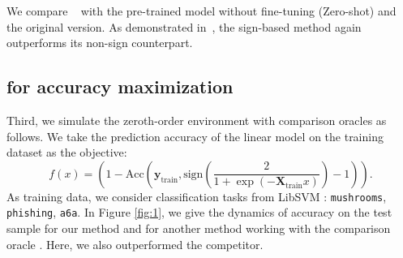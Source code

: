 We compare ~ with the pre-trained model without fine-tuning (Zero-shot) and the original  version. As demonstrated in~, the sign-based method again outperforms its non-sign counterpart.
\vspace{-5pt}
\subsection{ for accuracy maximization}
Third, we simulate the zeroth-order environment with comparison oracles as follows. We take the prediction accuracy of the linear model on the training dataset as the objective:
\vspace{-2mm}
\begin{equation*}
\textstyle
    f(x) = \left(\!1 - \text{Acc}\!\left(\mathbf{y}_{\text{train}}, \text{sign}\!\left(\!\frac{2}{1 + \exp (- \mathbf{X}_{\text{train}} x)}\!\right) - 1\!\right)\!\right).    
\end{equation*}
As training data, we consider classification tasks from LibSVM \cite{chang2011libsvm}: \texttt{mushrooms}, \texttt{phishing}, \texttt{a6a}. 
In Figure \ref{fig:1}, we give the dynamics of accuracy on the test sample for our method and for another method working with the comparison oracle  \cite{lobanov2024order}. Here, we also outperformed the competitor. 

